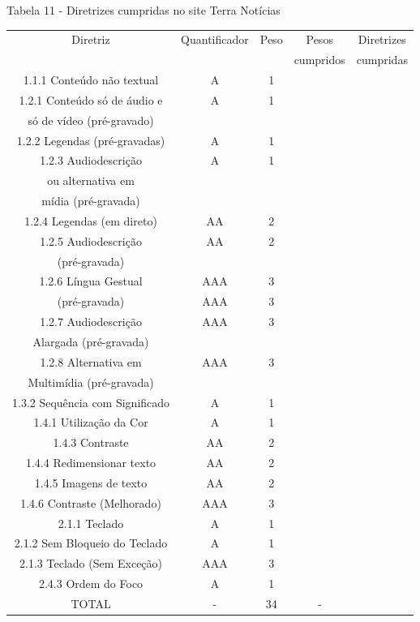 \documentclass[a4paper]{article}
\begin{document}
\begin{titlepage}
Tabela 11 - Diretrizes cumpridas no site Terra Notícias\\[-1cm]
\begin{center}
	\fontsize{8pt}{8pt}\selectfont	
	\begin{longtable}{|c|c|c|c|c|}
		\hline
		Diretriz & Quantificador & Peso & Pesos & Diretrizes\\
		& & & cumpridos & cumpridas\\
		\hline
		1.1.1 Conteúdo não textual & A & 1 & & \\
		\hline
		1.2.1 Conteúdo só de áudio e & A & 1 & & \\
		só de vídeo (pré-gravado) & & & & \\
		\hline
		1.2.2 Legendas (pré-gravadas) & A & 1 & & \\
		\hline
		1.2.3 Audiodescrição & A & 1 & & \\
		ou alternativa em & & & & \\
		mídia (pré-gravada) & & & & \\
		\hline
		1.2.4 Legendas (em direto) & AA & 2 & & \\
		\hline
		1.2.5 Audiodescrição & AA & 2 & & \\
		(pré-gravada) & & & & \\
		\hline
		1.2.6 Língua Gestual & AAA & 3 & & \\
		(pré-gravada) & AAA & 3 & & \\
		\hline
		1.2.7 Audiodescrição & AAA & 3 & & \\
		Alargada (pré-gravada) & & & & \\
		\hline
		1.2.8 Alternativa em & AAA & 3 & & \\
		Multimídia (pré-gravada) & & & & \\
		\hline
		1.3.2 Sequência com Significado & A & 1 & & \\
		\hline
		1.4.1 Utilização da Cor & A & 1 & & \\
		\hline
		1.4.3 Contraste & AA & 2 & & \\
		\hline
		1.4.4 Redimensionar texto & AA & 2 & & \\
		\hline
		1.4.5 Imagens de texto & AA & 2 & & \\
		\hline
		1.4.6 Contraste (Melhorado) & AAA & 3 & & \\
		\hline
		2.1.1 Teclado & A & 1 & & \\
		\hline
		2.1.2 Sem Bloqueio do Teclado & A & 1 & & \\
		\hline
		2.1.3 Teclado (Sem Exceção) & AAA & 3 & & \\
		\hline
		2.4.3 Ordem do Foco & A & 1 & & \\
		\hline
		TOTAL & - & 34 & - & \\
		\hline
	\end{longtable}
\end{center}


\end{titlepage}
\end{document}
